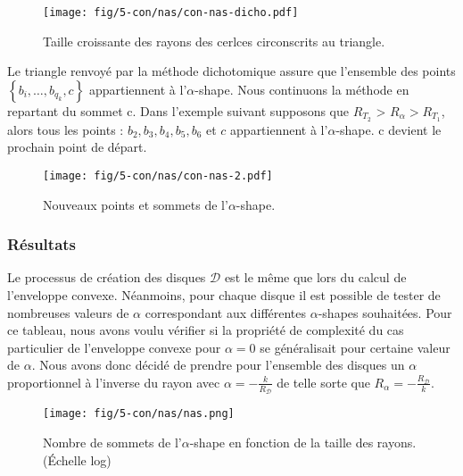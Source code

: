 \begin{figure}[H]
  \centering
  \texttt{[image: fig/5-con/nas/con-nas-dicho.pdf]}
  \caption{Taille croissante des rayons des cerlces circonscrits au triangle.}
  \label{fig:nas-dicho}
\end{figure}

Le triangle renvoyé par la méthode dichotomique assure que l'ensemble des points $\left\{ b_{i},\ldots, b_{q_k}, c \right\}$ appartiennent à l'$\alpha$-shape. Nous continuons la méthode en repartant du sommet c. Dans l'exemple suivant supposons que $R_{T_{2}}$ > $R_{\alpha} >  R_{T_{1}}$, alors tous les points : $b_{2}, b_{3}, b_{4}, b_{5}, b_{6}$ et $c$ appartiennent à l'$\alpha$-shape. c devient le prochain point de départ.
 
\begin{figure}[H]
  \centering
  \texttt{[image: fig/5-con/nas/con-nas-2.pdf]}
  \caption{Nouveaux points et sommets de l'$\alpha$-shape.}
\end{figure}


\subsubsection{Résultats}

Le processus de création des disques $\mathcal{D}$ est le même que lors du calcul de l'enveloppe convexe. Néanmoins, pour chaque disque il est possible de tester de nombreuses valeurs de $\alpha$ correspondant aux différentes $\alpha$-shapes souhaitées. Pour ce tableau, nous avons voulu vérifier si la propriété de complexité du cas particulier de l'enveloppe convexe pour $\alpha = 0$ se généralisait pour certaine valeur de $\alpha$. Nous avons donc décidé de prendre pour l'ensemble des disques un $\alpha$ proportionnel à l'inverse du rayon avec $\alpha = -\frac{k}{R_{\mathcal{D}}}$ de telle sorte que $R_{\alpha} = -\frac{R_{\mathcal{D}}}{k}$.
 

\begin{figure}[H]
  \centering
  \texttt{[image: fig/5-con/nas/nas.png]}
  \caption{Nombre de sommets de l'$\alpha$-shape en fonction de la taille des rayons. (Échelle log)}
\end{figure}


